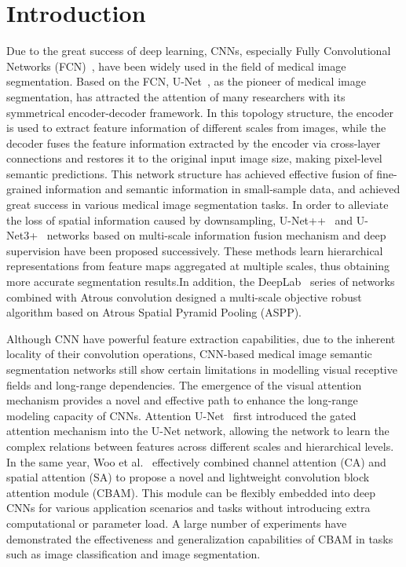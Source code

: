 \section{Introduction}

Due to the great success of deep learning, CNNs, especially Fully Convolutional Networks (FCN)~\cite{long2015fully}, have been widely used in the field of medical image segmentation. Based on the FCN, U-Net~\cite{ronneberger2015u}, as the pioneer of medical image segmentation, has attracted the attention of many researchers with its symmetrical encoder-decoder framework. In this topology structure, the encoder is used to extract feature information of different scales from images, while the decoder fuses the feature information extracted by the encoder via cross-layer connections and restores it to the original input image size, making pixel-level semantic predictions. This network structure has achieved effective fusion of fine-grained information and semantic information in small-sample data, and achieved great success in various medical image segmentation tasks. In order to alleviate the loss of spatial information caused by downsampling, U-Net++~\cite{zhou2019unet++} and U-Net3+~\cite{huang2020unet} networks based on multi-scale information fusion mechanism and deep supervision have been proposed successively. These methods learn hierarchical representations from feature maps aggregated at multiple scales, thus obtaining more accurate segmentation results.In addition, the DeepLab~\cite{liang2015semantic,chen2017deeplab,chen2017rethinking,chen2018encoder} series of networks combined with Atrous convolution designed a multi-scale objective robust algorithm based on Atrous Spatial Pyramid Pooling (ASPP).

Although CNN have powerful feature extraction capabilities, due to the inherent locality of their convolution operations, CNN-based medical image semantic segmentation networks still show certain limitations in modelling visual receptive fields and long-range dependencies. The emergence of the visual attention mechanism provides a novel and effective path to enhance the long-range modeling capacity of CNNs. Attention U-Net~\cite{oktay2018attention} first introduced the gated attention mechanism into the U-Net network, allowing the network to learn the complex relations between features across different scales and hierarchical levels. In the same year, Woo et al.~\cite{woo2018cbam} effectively combined channel attention (CA) and spatial attention (SA) to propose a novel and lightweight convolution block attention module (CBAM). This module can be flexibly embedded into deep CNNs for various application scenarios and tasks without introducing extra computational or parameter load. A large number of experiments have demonstrated the effectiveness and generalization capabilities of CBAM in tasks such as image classification and image segmentation.

